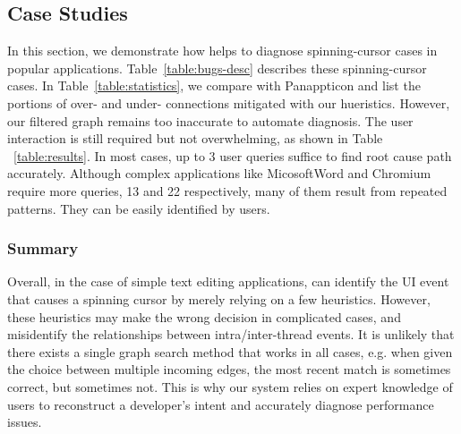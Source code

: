 \subsection{Case Studies}\label{sec:casestudy}

In this section, we demonstrate how \xxx helps to diagnose \nbug spinning-cursor
cases in popular applications. Table~\ref{table:bugs-desc} describes these
spinning-cursor cases. In Table~\ref{table:statistics}, we compare \xxx with
Panappticon and list the portions of over- and under- connections mitigated with
our hueristics. However, our filtered graph remains too inaccurate to automate
diagnosis. The user interaction is still required but not overwhelming, as shown
in Table ~\ref{table:results}. In most cases, up to 3 user queries suffice to
find root cause path accurately. Although complex applications like MicosoftWord
and Chromium require more queries, 13 and 22 respectively, many of them result
from repeated patterns. They can be easily identified by users.








\subsubsection{Summary}
Overall, in the case of simple text editing applications, \xxx can identify the
UI event that causes a spinning cursor by merely relying on a few heuristics.
However, these heuristics may make the wrong decision in complicated cases, and
misidentify the relationships between intra/inter-thread events. It is unlikely
that there exists a single graph search method that works in all cases, e.g.
when given the choice between multiple incoming edges, the most recent match is
sometimes correct, but sometimes not. This is why our system relies on expert
knowledge of users to reconstruct a developer's intent and accurately diagnose
performance issues.
